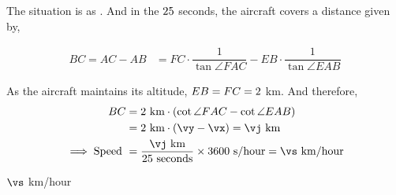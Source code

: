 \begin{solution}[\halfpage]
	The situation is as \asif. And in the $25$ seconds, the aircraft covers 
	a distance given by, 
	
	\begin{align}
		BC = AC - AB &= FC\cdot\dfrac{1}{\tan\angle{FAC}} - EB\cdot\dfrac{1}{\tan\angle{EAB}}
	\end{align}
	
	As the aircraft maintains its altitude, $EB = FC = 2$ km. And therefore, 
	\begin{align}
    BC &= \vh\text{ km}\cdot(\cot\angle{FAC}-\cot\angle{EAB}) \\
      &= \vh\text{ km}\cdot(\vy-\vx) = \vj\text{ km} \\
      \implies\text{Speed } &= \dfrac{\vj\text{ km}}{\vt\text{ seconds}}\times 3600\text{ s/hour} = \vs\text{ km/hour}
	\end{align}
\end{solution}
\ifprintanswers\begin{codex}$\vs$ km/hour\end{codex}\fi
